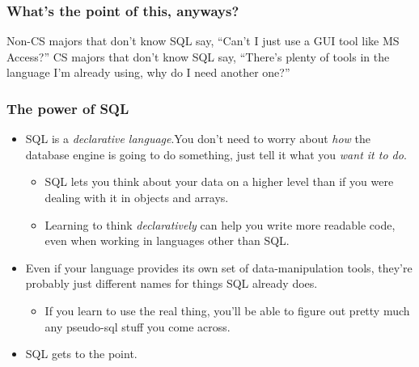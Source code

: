 \documentclass[aspectratio=169]{beamer}
\begin{document}
\begin{frame}
    \frametitle{What's the point of this, anyways?}

    Non-CS majors that don't know SQL say, ``Can't I just use a GUI tool like MS
    Access?''
    \vfill
    CS majors that don't know SQL say, ``There's plenty of tools in the language I'm already using, why do I need another one?''
\end{frame}

\begin{frame}
    \frametitle{The power of SQL}
    \begin{itemize}
        \item SQL is a \emph{declarative language}.\pause You don't need to
        worry about \emph{how} the database engine is going to do something,
        just tell it what you \emph{want it to do}.
        \pause
        \begin{itemize}
            \item SQL lets you think about your data on a higher level than if you
                  were dealing with it in objects and arrays.
            \item Learning to think \emph{declaratively} can help you write more
            readable code, even when working in languages other than SQL.
        \end{itemize}
        \pause
        \item Even if your language provides its own set of
        data-manipulation tools, they're probably just different names
        for things SQL already does.
        \pause
        \begin{itemize}
            \item If you learn to use the real thing, you'll be able to figure out
                  pretty much any pseudo-sql stuff you come across.
        \end{itemize}
        \pause
        \item SQL gets to the point.
    \end{itemize}
\end{frame}
\end{document}
